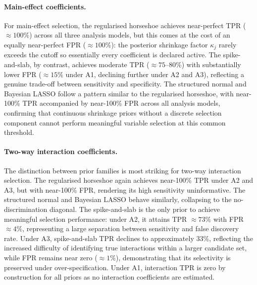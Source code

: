 \documentclass[12pt]{article}
\begin{document}
\paragraph{Main-effect coefficients.}
For main-effect selection, the regularised horseshoe achieves near-perfect TPR ($\approx 100\%$) across all three analysis models, but this comes at the cost of an 
equally near-perfect FPR ($\approx 100\%$): the posterior shrinkage factor $\kappa_j$ rarely exceeds the cutoff so essentially every coefficient is declared active. The spike-and-slab, by contrast, achieves moderate TPR ($\approx 75\text{--}80\%$) with substantially lower FPR ($\approx 15\%$ under A1, declining further under A2 and A3), reflecting a genuine trade-off between sensitivity and specificity. The structured normal and Bayesian LASSO follow a pattern similar to the regularised horseshoe, with near-100\% TPR accompanied by near-100\% FPR across all analysis models, confirming that continuous shrinkage priors without a discrete selection component cannot perform meaningful variable selection at this common threshold.

\paragraph{Two-way interaction coefficients.}
The distinction between prior families is most striking for two-way interaction selection. The regularised horseshoe again achieves near-100\% TPR under A2 and A3, but with near-100\% FPR, rendering its high sensitivity uninformative. The structured normal and Bayesian LASSO behave similarly, collapsing to the no-discrimination diagonal. The spike-and-slab is the only prior to achieve meaningful selection performance: under A2, it attains TPR $\approx 73\%$ with FPR $\approx 4\%$, representing a large separation between sensitivity and false discovery rate. Under A3, spike-and-slab TPR declines to approximately $33\%$, reflecting the increased difficulty of identifying true interactions within a larger candidate set, while FPR remains near zero ($\approx 1\%$), demonstrating that its selectivity is preserved under over-specification. Under A1, interaction TPR is zero by construction for all priors as no interaction coefficients are estimated.
\end{document}
